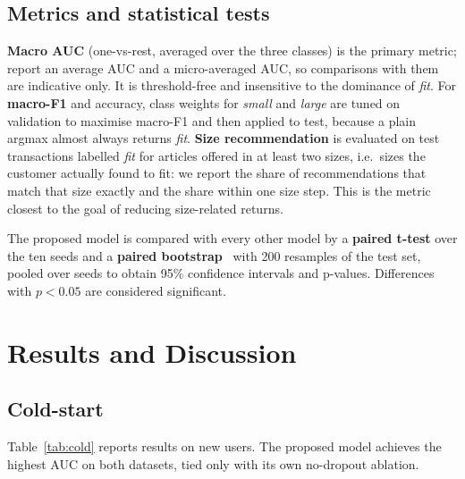 \subsection{Metrics and statistical tests}
\textbf{Macro AUC} (one-vs-rest, averaged over the three classes) is the primary metric; \cite{misra2018fit} report an average AUC and \cite{sheikh2019sfnet} a micro-averaged AUC, so comparisons with them are indicative only. It is threshold-free and insensitive to the dominance of \emph{fit}. For \textbf{macro-F1} and accuracy, class weights for \emph{small} and \emph{large} are tuned on validation to maximise macro-F1 and then applied to test, because a plain argmax almost always returns \emph{fit}. \textbf{Size recommendation} is evaluated on test transactions labelled \emph{fit} for articles offered in at least two sizes, i.e.\ sizes the customer actually found to fit: we report the share of recommendations that match that size exactly and the share within one size step. This is the metric closest to the goal of reducing size-related returns.

The proposed model is compared with every other model by a \textbf{paired t-test} over the ten seeds and a \textbf{paired bootstrap}~\cite{efron1993bootstrap} with 200 resamples of the test set, pooled over seeds to obtain 95\% confidence intervals and p-values. Differences with $p < 0.05$ are considered significant.

\section{Results and Discussion}\label{sec6}

\subsection{Cold-start}
Table~\ref{tab:cold} reports results on new users. The proposed model achieves the highest AUC on both datasets, tied only with its own no-dropout ablation.

